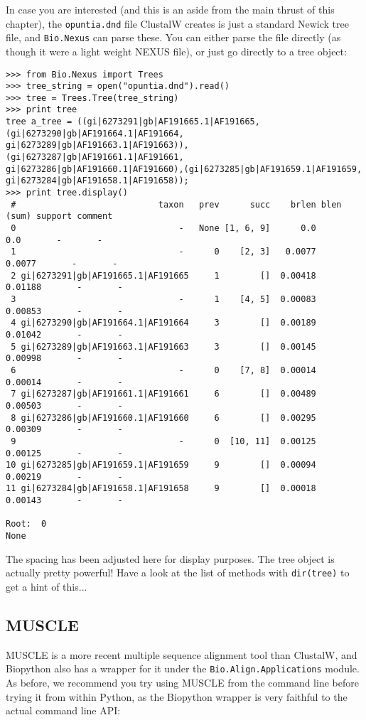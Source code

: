 \documentclass{report}
\begin{document}
In case you are interested (and this is an aside from the main thrust of this
chapter), the \texttt{opuntia.dnd} file ClustalW creates is just a standard
Newick tree file, and \verb|Bio.Nexus| can parse these. You can either parse
the file directly (as though it were a light weight NEXUS file), or just go
directly to a tree object:

\begin{verbatim}
>>> from Bio.Nexus import Trees
>>> tree_string = open("opuntia.dnd").read()
>>> tree = Trees.Tree(tree_string)
>>> print tree
tree a_tree = ((gi|6273291|gb|AF191665.1|AF191665,(gi|6273290|gb|AF191664.1|AF191664,
gi|6273289|gb|AF191663.1|AF191663)),(gi|6273287|gb|AF191661.1|AF191661,
gi|6273286|gb|AF191660.1|AF191660),(gi|6273285|gb|AF191659.1|AF191659,
gi|6273284|gb|AF191658.1|AF191658));
>>> print tree.display()
 #                            taxon   prev      succ    brlen blen (sum) support comment
 0                                -   None [1, 6, 9]      0.0        0.0       -       -
 1                                -      0    [2, 3]   0.0077     0.0077       -       -
 2 gi|6273291|gb|AF191665.1|AF191665     1        []  0.00418    0.01188       -       -
 3                                -      1    [4, 5]  0.00083    0.00853       -       -
 4 gi|6273290|gb|AF191664.1|AF191664     3        []  0.00189    0.01042       -       -
 5 gi|6273289|gb|AF191663.1|AF191663     3        []  0.00145    0.00998       -       -
 6                                -      0    [7, 8]  0.00014    0.00014       -       -
 7 gi|6273287|gb|AF191661.1|AF191661     6        []  0.00489    0.00503       -       -
 8 gi|6273286|gb|AF191660.1|AF191660     6        []  0.00295    0.00309       -       -
 9                                -      0  [10, 11]  0.00125    0.00125       -       -
10 gi|6273285|gb|AF191659.1|AF191659     9        []  0.00094    0.00219       -       -
11 gi|6273284|gb|AF191658.1|AF191658     9        []  0.00018    0.00143       -       -

Root:  0
None
\end{verbatim}

\noindent The spacing has been adjusted here for display purposes.
The tree object is actually pretty powerful! Have a look at the list of
methods with \texttt{dir(tree)} to get a hint of this...

\subsection{MUSCLE}
MUSCLE is a more recent multiple sequence alignment tool than ClustalW, and
Biopython also has a wrapper for it under the \verb|Bio.Align.Applications|
module. As before, we recommend you try using MUSCLE from the command line before
trying it from within Python, as the Biopython wrapper is very faithful to the
actual command line API:
\end{document}
